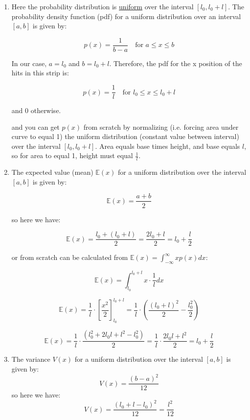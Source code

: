 \documentclass[10pt]{article}
\begin{document}
\begin{enumerate}[label=(\alph*)]
	\item Here the probability distribution is \href{https://en.wikipedia.org/wiki/Continuous_uniform_distribution}{uniform} over the interval $[l_0, l_0 + l]$. The probability density function (pdf) for a uniform distribution over an interval $[a, b]$ is given by:

	      \[ p(x) = \frac{1}{b - a} \quad \text{for } a \leq x \leq b \]

	      In our case, $a = l_0$ and $b = l_0 + l$. Therefore, the pdf for the x position of the hits in this strip is:

	      \[ \boxed{p(x) = \frac{1}{l} \quad \text{for } l_0 \leq x \leq l_0 + l} \]

	      and 0 otherwise.

	      and you can get $p(x)$ from scratch by normalizing (i.e. forcing area under curve to equal 1) the uniform distribution (constant value between interval) over the interval $[l_0, l_0 + l]$. Area equals base times height, and base equals $l$, so for area to equal 1, height must equal $\frac{1}{l}$.

	\item The expected value (mean) $\mathbb{E}(x)$ for a uniform distribution over the interval $[a, b]$ is given by:

	      \[ \mathbb{E}(x) = \frac{a + b}{2} \]

	      so here we have:

	      \[ \boxed{\mathbb{E}(x) = \frac{l_0 + (l_0 + l)}{2} = \frac{2l_0 + l}{2} = l_0 + \frac{l}{2}} \]


	      or from scratch can be calculated from $\mathbb{E}(x) = \int_{-\infty}^{\infty} x p(x) dx$:

	      \[ \mathbb{E}(x) = \int_{l_0}^{l_0 + l} x \cdot \frac{1}{l} dx \]

	      \[ \mathbb{E}(x) = \frac{1}{l} \cdot \left[ \frac{x^2}{2} \right]_{l_0}^{l_0 + l} = \frac{1}{l} \cdot \left( \frac{(l_0 + l)^2}{2} - \frac{l_0^2}{2} \right) \]

	      \[ \mathbb{E}(x) = \frac{1}{l} \cdot \frac{(l_0^2 + 2l_0 l + l^2 - l_0^2)}{2} = \frac{1}{l} \cdot \frac{2l_0 l + l^2}{2} = l_0 + \frac{l}{2} \]
	\item The variance $V(x)$ for a uniform distribution over the interval $[a, b]$ is given by:
	      \[ V(x) = \frac{(b - a)^2}{12} \]
	      so here we have:
	      \[ \boxed{V(x) = \frac{(l_0 + l - l_0)^2}{12} = \frac{l^2}{12}} \]



\end{enumerate}
\end{document}
